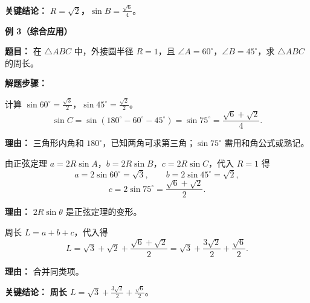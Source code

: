 \begin{examplebox}
	\textbf{\textcolor{CExample}{关键结论：}}
	\textbf{$R = \sqrt2$，$\sin B = \frac{\sqrt6}{4}$}。

	\medskip
	\textbf{\textcolor{CExample}{例 3（综合应用）}}

	\textbf{\textcolor{CExample}{题目：}}
	在 $\triangle ABC$ 中，外接圆半径 $R=1$，且 $\angle A = 60^\circ$，$\angle B = 45^\circ$，求 $\triangle ABC$ 的周长。

	\textbf{\textcolor{CExample}{解题步骤：}}
	\begin{description}[style=nextline, leftmargin=2.8em, labelsep=0.5em, itemsep=0.45em]
		\item[\textbf{第一步（求$\sin$值）：}] 计算 $\sin 60^\circ = \frac{\sqrt3}{2}$，$\sin 45^\circ = \frac{\sqrt2}{2}$。
			\[
				\sin C = \sin(180^\circ - 60^\circ - 45^\circ) = \sin 75^\circ = \frac{\sqrt6 + \sqrt2}{4}.
			\]
			\par\textbf{理由：} 三角形内角和 $180^\circ$，已知两角可求第三角；$\sin 75^\circ$ 需用和角公式或熟记。

		\item[\textbf{第二步（由$R$求各边）：}] 由正弦定理 $a = 2R\sin A$，$b = 2R\sin B$，$c = 2R\sin C$，代入 $R=1$ 得
			\[
				a = 2\sin 60^\circ = \sqrt3,
				\qquad
				b = 2\sin 45^\circ = \sqrt2,
			\]
			\[
				c = 2\sin 75^\circ = \frac{\sqrt6 + \sqrt2}{2}.
			\]
			\par\textbf{理由：} $2R\sin \theta$ 是正弦定理的变形。

		\item[\textbf{第三步（求周长）：}] 周长 $L = a+b+c$，代入得
			\[
				L = \sqrt3 + \sqrt2 + \frac{\sqrt6 + \sqrt2}{2} = \sqrt3 + \frac{3\sqrt2}{2} + \frac{\sqrt6}{2}.
			\]
			\par\textbf{理由：} 合并同类项。
	\end{description}

	\textbf{\textcolor{CExample}{关键结论：}}
	\textbf{周长 $L = \sqrt3 + \frac{3\sqrt2}{2} + \frac{\sqrt6}{2}$}。
\end{examplebox}
